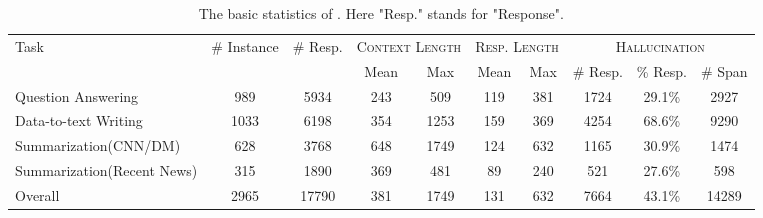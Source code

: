 

\begin{table}[t]
\centering
\scriptsize
\begin{tabular}{l|ccccccccc}
\toprule
\multirow{2}{*}{Task} & \multirow{2}{*}{\# Instance} & \multirow{2}{*}{\# Resp.} & \multicolumn{2}{c}{\textsc{Context Length}} & \multicolumn{2}{c}{\textsc{Resp. Length}} &\multicolumn{3}{c}{\textsc{Hallucination}} \\
\cmidrule(lr){4-5} \cmidrule(lr){6-7} \cmidrule(lr){8-10}
  & & & Mean  & Max  & Mean  & Max & \# Resp. & \% Resp. & \# Span \\
\midrule
Question Answering & 989 & 5934 & 243 & 509 & 119 &381 & 1724 & 29.1\% & 2927 \\
Data-to-text Writing & 1033  & 6198 & 354 & 1253 & 159 & 369 & 4254 & 68.6\% & 9290 \\
Summarization(CNN/DM) & 628 & 3768 & 648 & 1749 & 124 & 632 & 1165 & 30.9\% & 1474 \\
Summarization(Recent News) & 315 & 1890 & 369 & 481  & 89  & 240  & 521 & 27.6\% & 598 \\
\midrule
Overall & 2965 & 17790 & 381 & 1749 & 131 & 632 & 7664 & 43.1\% & 14289 \\
\bottomrule
\end{tabular}
\caption{The basic statistics of \CorpusName. Here "Resp." stands for "Response".}
\label{tab:basic_stat}
\end{table}